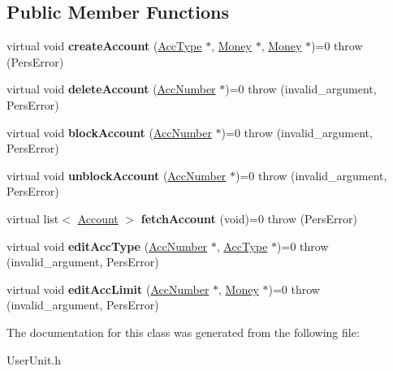 \subsection*{Public Member Functions}
\begin{DoxyCompactItemize}
\item 
\hypertarget{classUserAccAdm_a23b313ce179890606746ab3a279bd833}{virtual void {\bfseries create\-Account} (\hyperlink{classUsrType}{Acc\-Type} $\ast$, \hyperlink{classMoney}{Money} $\ast$, \hyperlink{classMoney}{Money} $\ast$)=0  throw (\-Pers\-Error)}\label{dd/d35/classUserAccAdm_a23b313ce179890606746ab3a279bd833}

\item 
\hypertarget{classUserAccAdm_a8257788e5e7d125b7482e490a6d71550}{virtual void {\bfseries delete\-Account} (\hyperlink{classAccNumber}{Acc\-Number} $\ast$)=0  throw (invalid\-\_\-argument, Pers\-Error)}\label{dd/d35/classUserAccAdm_a8257788e5e7d125b7482e490a6d71550}

\item 
\hypertarget{classUserAccAdm_ad9cdd01395ad7dd1b2c0887fe12b71b8}{virtual void {\bfseries block\-Account} (\hyperlink{classAccNumber}{Acc\-Number} $\ast$)=0  throw (invalid\-\_\-argument, Pers\-Error)}\label{dd/d35/classUserAccAdm_ad9cdd01395ad7dd1b2c0887fe12b71b8}

\item 
\hypertarget{classUserAccAdm_ae179b3e21f336b325452eb3c0981b0d9}{virtual void {\bfseries unblock\-Account} (\hyperlink{classAccNumber}{Acc\-Number} $\ast$)=0  throw (invalid\-\_\-argument, Pers\-Error)}\label{dd/d35/classUserAccAdm_ae179b3e21f336b325452eb3c0981b0d9}

\item 
\hypertarget{classUserAccAdm_aa84b9df92ad9e11b1d9c71e9350efdc7}{virtual list$<$ \hyperlink{classAccount}{Account} $>$ {\bfseries fetch\-Account} (void)=0  throw (\-Pers\-Error)}\label{dd/d35/classUserAccAdm_aa84b9df92ad9e11b1d9c71e9350efdc7}

\item 
\hypertarget{classUserAccAdm_a80d61347b448e3ae9bdca4e02e65bcd1}{virtual void {\bfseries edit\-Acc\-Type} (\hyperlink{classAccNumber}{Acc\-Number} $\ast$, \hyperlink{classUsrType}{Acc\-Type} $\ast$)=0  throw (invalid\-\_\-argument, Pers\-Error)}\label{dd/d35/classUserAccAdm_a80d61347b448e3ae9bdca4e02e65bcd1}

\item 
\hypertarget{classUserAccAdm_a43f0bb580d63a9c782e8c83417562a17}{virtual void {\bfseries edit\-Acc\-Limit} (\hyperlink{classAccNumber}{Acc\-Number} $\ast$, \hyperlink{classMoney}{Money} $\ast$)=0  throw (invalid\-\_\-argument, Pers\-Error)}\label{dd/d35/classUserAccAdm_a43f0bb580d63a9c782e8c83417562a17}

\end{DoxyCompactItemize}


The documentation for this class was generated from the following file\-:\begin{DoxyCompactItemize}
\item 
User\-Unit.\-h\end{DoxyCompactItemize}
